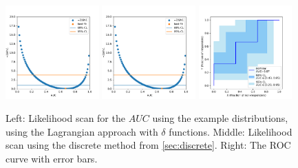 \documentclass[11pt]{article}
\newcommand{\AUC}{AUC}
\begin{document}
\begin{figure}
\begin{center}
\includegraphics[width=0.32\textwidth]{deltafunctions_scan.pdf}
\includegraphics[width=0.32\textwidth]{discrete_scan_compare_to_delta_functions.pdf}
\includegraphics[width=0.32\textwidth]{deltafunctions_exampleroc_errors.pdf}
\caption{Left: Likelihood scan for the \(\AUC\) using the example distributions, using the Lagrangian approach with \(\delta\) functions.  Middle: Likelihood scan using the discrete method from \cref{sec:discrete}.  Right: The ROC curve with error bars.}
\label{fig:exampledata_delta_functions_agreement}
\end{center}
\end{figure}
\end{document}
